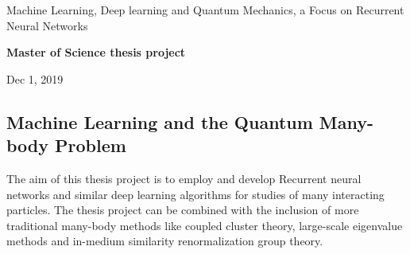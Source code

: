 \documentclass[%
oneside,                 %
final,                   %
10pt]{article}
\begin{document}

\newcommand{\exercisesection}[1]{\subsection*{#1}}






\thispagestyle{empty}

\begin{center}
{\LARGE\bf
\begin{spacing}{1.25}
Machine Learning, Deep learning and Quantum Mechanics, a Focus on Recurrent Neural Networks
\end{spacing}
}
\end{center}


\begin{center}
{\bf Master of Science thesis project${}^{}$} \\ [0mm]
\end{center}

\begin{center}
\end{center}
    

\begin{center}
Dec 1, 2019
\end{center}

\vspace{1cm}


\subsection*{Machine Learning and the Quantum Many-body Problem}


The aim of this thesis project is to employ and develop Recurrent neural
networks and similar deep learning algorithms  for studies of many
interacting particles.  The thesis project can be combined with the
inclusion of more traditional many-body methods like coupled cluster
theory, large-scale eigenvalue methods and in-medium similarity
renormalization group theory.
\end{document}
